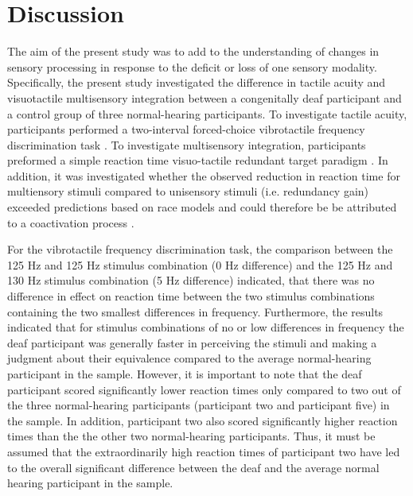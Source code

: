 \documentclass[12pt]{article}
\begin{document}
\section{Discussion}
The aim of the present study was to add to the understanding of changes in sensory processing in response to the deficit or loss of one sensory modality. Specifically, the present study investigated the difference in tactile acuity and visuotactile multisensory integration between a congenitally deaf participant and a control group of three normal-hearing participants. To investigate tactile acuity, participants performed a two-interval forced-choice vibrotactile frequency discrimination task \parencite{alary_tactile_2009}. To investigate multisensory integration, participants preformed a simple reaction time visuo-tactile redundant target paradigm \parencite{girard_multisensory_2011}. In addition, it was investigated whether the observed reduction in reaction time for multiensory stimuli compared to unisensory stimuli (i.e. redundancy gain) exceeded predictions based on race models and could therefore be be attributed to a coactivation process \parencite{miller_divided_1982,ulrich_testing_2007}.
\par For the vibrotactile frequency discrimination task, the comparison between the 125 Hz and 125 Hz stimulus combination (0 Hz difference) and the 125 Hz and 130 Hz stimulus combination (5 Hz difference) indicated, that there was no difference in effect on reaction time between the two stimulus combinations containing the two smallest differences in frequency. Furthermore, the results indicated that for stimulus combinations of no or low differences in frequency the deaf participant was generally faster in perceiving the stimuli and making a judgment about their equivalence compared to the average normal-hearing participant in the sample. However, it is important to note that the deaf participant scored significantly lower reaction times only compared to two out of the three normal-hearing participants (participant two and participant five) in the sample. In addition, participant two also scored significantly higher reaction times than the the other two normal-hearing participants. Thus, it must be assumed that the extraordinarily high reaction times of participant two have led to the overall significant difference between the deaf and the average normal hearing participant in the sample. 
%
\end{document}
